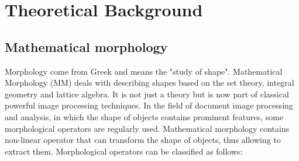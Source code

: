 
\graphicspath{ {3chapterTheory/image/} }
\chapter{Theoretical Background}
\section{Mathematical morphology} \label{MM}
Morphology come from Greek and means the "study of shape". Mathematical Morphology (MM) deals with describing shapes based on the set theory, integral geometry and lattice algebra. It is not just a theory but is now part of classical powerful image processing techniques. In the field of document image processing and analysis, in which the shape of objects contains prominent features, some morphological operators are regularly used. Mathematical morphology contains non-linear operator that can transform the shape of objects, thus allowing to extract them. Morphological operators can be classified as follows:
